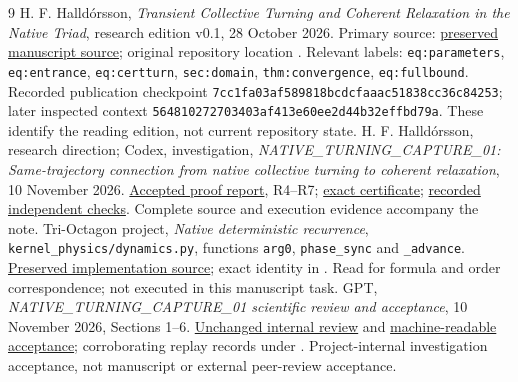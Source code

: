 \begin{thebibliography}{9}\small
{} H. F. Halld\'orsson, \emph{Transient Collective Turning and Coherent Relaxation in the Native Triad}, research edition v0.1, 28 October 2026. Primary source: \href{evidence/accepted_capture/submitted/sources/collective/main.tex}{preserved manuscript source}; original repository location . Relevant labels: \texttt{eq:parameters}, \texttt{eq:entrance}, \texttt{eq:certturn}, \texttt{sec:domain}, \texttt{thm:convergence}, \texttt{eq:fullbound}. Recorded publication checkpoint \nolinkurl{7cc1fa03af589818bcdcfaaac51838cc36c84253}; later inspected context \nolinkurl{564810272703403af413e60ee2d44b32effbd79a}. These identify the reading edition, not current repository state.
 H. F. Halld\'orsson, research direction; Codex, investigation, \emph{NATIVE\_TURNING\_CAPTURE\_01: Same-trajectory connection from native collective turning to coherent relaxation}, 10 November 2026. \href{evidence/accepted_capture/submitted/NATIVE_TURNING_CAPTURE_01_PROOF_REVIEW.md}{Accepted proof report}, R4--R7; \href{evidence/accepted_capture/submitted/data/CERTIFICATE.json}{exact certificate}; \href{evidence/accepted_capture/submitted/data/CERTIFICATE_CHECK.json}{recorded independent checks}. Complete source and execution evidence accompany the note.
 Tri-Octagon project, \emph{Native deterministic recurrence}, \texttt{kernel\_physics/dynamics.py}, functions \texttt{arg0}, \texttt{phase\_sync} and \texttt{\_advance}. \href{evidence/accepted_capture/submitted/sources/dynamics.py}{Preserved implementation source}; exact identity in . Read for formula and order correspondence; not executed in this manuscript task.
 GPT, \emph{NATIVE\_TURNING\_CAPTURE\_01 scientific review and acceptance}, 10 November 2026, Sections 1--6. \href{evidence/accepted_capture/NATIVE_TURNING_CAPTURE_01_GPT_REVIEW.md}{Unchanged internal review} and \href{evidence/accepted_capture/GPT_ACCEPTANCE.json}{machine-readable acceptance}; corroborating replay records under . Project-internal investigation acceptance, not manuscript or external peer-review acceptance.
\end{thebibliography}
